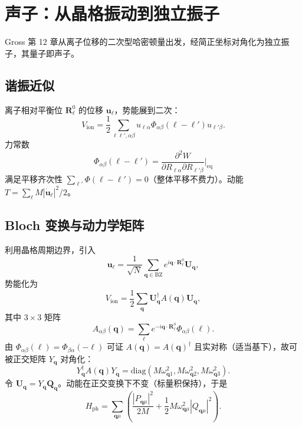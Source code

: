 \section{声子：从晶格振动到独立振子}

Gross 第 12 章从离子位移的二次型哈密顿量出发，经简正坐标对角化为独立振子，其量子即声子。

\subsection{谐振近似}

离子相对平衡位 $\mathbf{R}_\ell^0$ 的位移 $\mathbf{u}_\ell$，势能展到二次：
\begin{equation}
  V_{\mathrm{ion}}
  =\frac12\sum_{\ell\ell',\alpha\beta}
  u_{\ell\alpha}
  \Phi_{\alpha\beta}(\ell-\ell')
  u_{\ell'\beta}.
\end{equation}
力常数
\begin{equation}
  \Phi_{\alpha\beta}(\ell-\ell')
  =\frac{\partial^2 W}{\partial R_{\ell\alpha}\partial R_{\ell'\beta}}\Big|_{\mathrm{eq}}
\end{equation}
满足平移齐次性 $\sum_{\ell'}\Phi(\ell-\ell')=0$（整体平移不费力）。动能
$T=\sum_{\ell}M|\dot{\mathbf{u}}_\ell|^2/2$。

\subsection{Bloch 变换与动力学矩阵}

利用晶格周期边界，引入
\begin{equation}
  \mathbf{u}_\ell
  =\frac{1}{\sqrt{N}}
  \sum_{\mathbf{q}\in\mathrm{BZ}}
  e^{i\mathbf{q}\cdot\mathbf{R}_\ell^0}
  \mathbf{U}_{\mathbf{q}},
\end{equation}
势能化为
\begin{equation}
  V_{\mathrm{ion}}
  =\frac12\sum_{\mathbf{q}}
  \mathbf{U}_{\mathbf{q}}^\dagger
  A(\mathbf{q})
  \mathbf{U}_{\mathbf{q}},
\end{equation}
其中 $3\times3$ 矩阵
\begin{equation}
  A_{\alpha\beta}(\mathbf{q})
  =\sum_{\boldsymbol{\ell}}
  e^{-i\mathbf{q}\cdot\mathbf{R}_\ell^0}
  \Phi_{\alpha\beta}(\boldsymbol{\ell}).
\end{equation}
由 $\Phi_{\alpha\beta}(\boldsymbol{\ell})=\Phi_{\beta\alpha}(-\boldsymbol{\ell})$ 可证 $A(\mathbf{q})=A(\mathbf{q})^\dagger$ 且实对称（适当基下），故可被正交矩阵 $Y_{\mathbf{q}}$ 对角化：
\begin{equation}
  Y_{\mathbf{q}}^\dagger A(\mathbf{q})Y_{\mathbf{q}}
  =\mathrm{diag}(M\omega_{\mathbf{q}1}^2,M\omega_{\mathbf{q}2}^2,M\omega_{\mathbf{q}3}^2).
\end{equation}
令 $\mathbf{U}_{\mathbf{q}}=Y_{\mathbf{q}}\mathbf{Q}_{\mathbf{q}}$。动能在正交变换下不变（标量积保持），于是
\begin{equation}
  H_{\mathrm{ph}}
  =\sum_{\mathbf{q}\mu}
  \left(
  \frac{|P_{\mathbf{q}\mu}|^2}{2M}
  +\frac12 M\omega_{\mathbf{q}\mu}^2 |Q_{\mathbf{q}\mu}|^2
  \right).
\label{eq:Hph_classical}
\end{equation}

